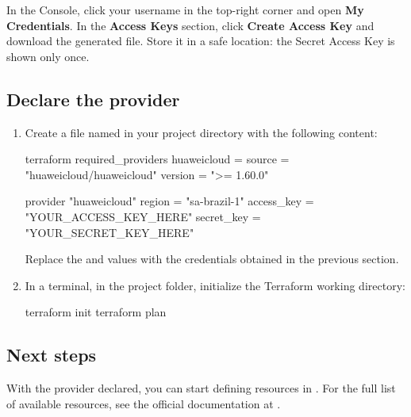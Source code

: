 \documentclass[english]{labguide}
\begin{document}

In the Console, click your username in the top-right corner and open
\textbf{My Credentials}. In the \textbf{Access Keys} section, click
\textbf{Create Access Key} and download the generated file. Store it in a
safe location: the Secret Access Key is shown only once.

\subsection{Declare the provider}

\passoapasso
\begin{enumerate}
  \item Create a file named  in your project directory
        with the following content:

  \begin{codigo}
terraform {
  required_providers {
    huaweicloud = {
      source  = "huaweicloud/huaweicloud"
      version = ">= 1.60.0"
    }
  }
}

provider "huaweicloud" {
  region     = "sa-brazil-1"
  access_key = "YOUR_ACCESS_KEY_HERE"
  secret_key = "YOUR_SECRET_KEY_HERE"
}
  \end{codigo}

  Replace the  and  values with the
  credentials obtained in the previous section.

  \item In a terminal, in the project folder, initialize the Terraform
        working directory:

  \begin{codigo}[bash]
terraform init
terraform plan
  \end{codigo}

\end{enumerate}

\subsection{Next steps}

With the provider declared, you can start defining resources in
. For the full list of available resources, see the official
documentation at
.
\end{document}
